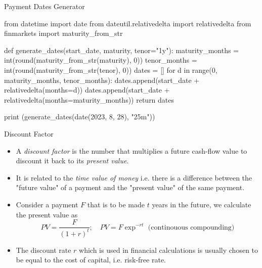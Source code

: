 \documentclass{beamer}
\begin{document}
\begin{frame}[fragile]{Payment Dates Generator}
  \begin{ipython}
from datetime import date
from dateutil.relativedelta import relativedelta
from finmarkets import maturity_from_str
			
def generate_dates(start_date, maturity, tenor="1y"):
    maturity_months = int(round(maturity_from_str(maturity), 0))
    tenor_months = int(round(maturity_from_str(tenor), 0))
    dates = []
    for d in range(0, maturity_months, tenor_months):
        dates.append(start_date + relativedelta(months=d))
    dates.append(start_date + relativedelta(months=maturity_months))
    return dates
			
print (generate_dates(date(2023, 8, 28), "25m"))
\end{ipython}
\begin{ioutput}
\end{ioutput}
\end{frame}

\begin{frame}{Discount Factor}
  \begin{itemize}
  \item A \emph{discount factor} is the number that multiplies a future cash-flow value to discount it back to its \emph{present value}.
  \item It is related to the \emph{time value of money} i.e. there is a difference between the "future value" of a payment and the "present value" of the same payment.
  \item Consider a payment $F$ that is to be made $t$ years in the future, we calculate the present value as
    \begin{equation}
      PV = \frac{F}{(1+r)^t};\quad PV=F\exp^{-rt}\textrm{ (continouous compounding)}
    \end{equation}
  \item The discount rate $r$ which is used in financial calculations is usually chosen to be equal to the cost of capital, i.e. risk-free rate.
  \end{itemize}
\end{frame}
\end{document}
